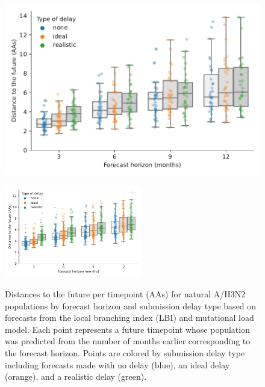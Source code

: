 \documentclass[9pt,lineno]{elife}
\begin{document}
\begin{figure}[htb]
\includegraphics[width=\linewidth]{figures/h3n2_distances_to_the_future_by_delay_and_horizon}
\caption{Distances to the future per timepoint (AAs) for natural A/H3N2 populations by forecast horizon and submission delay type based on forecasts from the local branching index (LBI) and mutational load model.
  Each point represents a future timepoint whose population was predicted from the number of months earlier corresponding to the forecast horizon.
  Points are colored by submission delay type including forecasts made with no delay (blue), an ideal delay (orange), and a realistic delay (green).}
\label{fig:h3n2_distances_to_the_future}
%
{\includegraphics[width=6cm]{figures/simulated_distances_to_the_future_by_delay_and_horizon}}\label{figsupp:simulated_distances_to_the_future}
%
\label{figdata:h3n2_distances_to_the_future}
\label{figsrccode:distances_to_the_future}
\end{figure}
\end{document}
